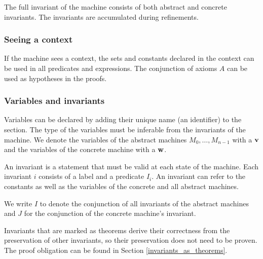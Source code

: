 The full invariant of the machine consists of both abstract and concrete invariants. 
The invariants are accumulated during refinements.


\subsubsection{Seeing a context}
\label{seeing_a_context}
If the machine sees a context, the sets and constants declared in the context can be used in
 all predicates and expressions.
The conjunction of axioms $A$ can be used as hypotheses in the proofs.

\subsubsection{Variables and invariants}
\label{variables_and_invariants}
Variables can be declared by adding their unique name (an identifier) to the  section. 
The type of the variables must be inferable from the invariants of the machine.
We denote the variables of the abstract machines $M_0,\ldots,M_{n-1}$ with a $\mathbf{v}$ and the variables of the concrete machine with a $\mathbf{w}$.

An invariant is a statement that must be valid at each state of the machine.
Each invariant $i$ consists of a label and a predicate $I_i$.
An invariant can refer to the constants as well as the variables of the concrete and all abstract machines.

We write $I$ to denote the conjunction of all invariants
of the abstract machines and $J$ for the conjunction of the concrete machine's invariant.

Invariants that are marked as theorems derive their correctness from the preservation
  of other invariants, so their preservation does not need to be proven.
The proof obligation can be found in Section \ref{invariants_as_theorems}.

